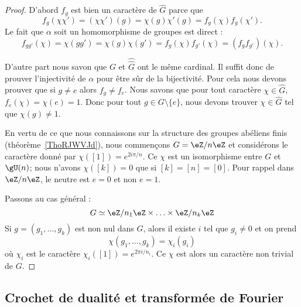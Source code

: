 \begin{proof}

	D'abord \( f_g\) est bien un caractère de \( \hat G\) parce que
	\begin{equation}
		f_g(\chi\chi')=(\chi\chi')(g)=\chi(g)\chi'(g)=f_g(\chi)f_g(\chi').
	\end{equation}
	Le fait que \( \alpha\) soit un homomorphisme de groupes est direct :
	\begin{equation}
		f_{gg'}(\chi)=\chi(gg')=\chi(g)\chi(g')=f_g(\chi)f_{g'}(\chi)=(f_gf_{g'})(\chi).
	\end{equation}

	D'autre part nous savon que \( G\) et \( \hat{\hat G}\) ont le même cardinal. Il suffit donc de prouver l'injectivité de \( \alpha\) pour être sûr de la bijectivité. Pour cela nous devons prouver que si \( g\neq e\) alors \( f_g\neq f_e\). Nous savons que pour tout caractère \( \chi\in \hat G\), \( f_e(\chi)=\chi(e)=1\). Donc pour tout \( g\in G\setminus\{ e \}\), nous devons trouver \( \chi\in \hat G\) tel que \( \chi(g)\neq 1\).

	En vertu de ce que nous connaissons sur la structure des groupes abéliens finis (théorème~\ref{ThoRJWVJd}), nous commençons \( G=\eZ/n\eZ\) et considérons le caractère donné par \( \chi([1])= e^{2i\pi/n}\). Ce \( \chi\) est un isomorphisme entre \( G\) et \( \gU(n)\); nous n'avons \( \chi([k])=0\) que si \( [k]=[n]=[0]\). Pour rappel dans \( \eZ/n\eZ\), le neutre est \( e=0\) et non \( e=1\).

	Passons au cas général :
	\begin{equation}
		G\simeq \eZ/n_1\eZ\times \ldots\times \eZ/n_k\eZ
	\end{equation}
	Si \( g=(g_1,\ldots, g_k)\) est non nul dans \( G\), alors il existe \( i\) tel que \( g_i\neq 0\) et on prend
	\begin{equation}
		\chi(g_1,\ldots, g_k)=\chi_i(g_i)
	\end{equation}
	où \( \chi_i\) est le caractère \( \chi_i([1])= e^{2\pi i/n_i}\). Ce \( \chi\) est alors un caractère non trivial de \( G\).

\end{proof}

\subsection{Crochet de dualité et transformée de Fourier}

